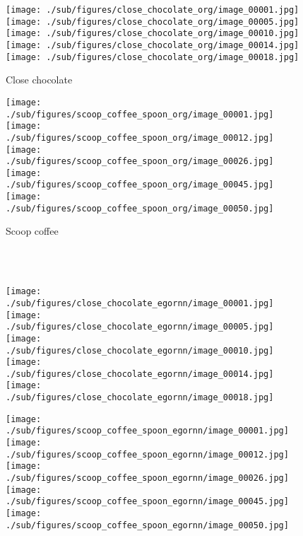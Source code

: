 \documentclass[10pt,twocolumn,letterpaper]{article}
\begin{document}
\begin{matrix*}[r]
\begin{figure*}[t]
		\centering      
        \begin{subfigure}[b]{0.4\textwidth}
			\caption*{Close chocolate}
\vspace{-0.18cm}
			\texttt{[image: ./sub/figures/close\_chocolate\_org/image\_00001.jpg]}
			\texttt{[image: ./sub/figures/close\_chocolate\_org/image\_00005.jpg]}
			\texttt{[image: ./sub/figures/close\_chocolate\_org/image\_00010.jpg]}
			\texttt{[image: ./sub/figures/close\_chocolate\_org/image\_00014.jpg]}
			\texttt{[image: ./sub/figures/close\_chocolate\_org/image\_00018.jpg]}
			\end{subfigure} \hskip 5mm
	        \begin{subfigure}[b]{0.4\textwidth}
			\caption*{Scoop coffee}
\vspace{-0.18cm}
			\texttt{[image: ./sub/figures/scoop\_coffee\_spoon\_org/image\_00001.jpg]}
			\texttt{[image: ./sub/figures/scoop\_coffee\_spoon\_org/image\_00012.jpg]}
			\texttt{[image: ./sub/figures/scoop\_coffee\_spoon\_org/image\_00026.jpg]}
			\texttt{[image: ./sub/figures/scoop\_coffee\_spoon\_org/image\_00045.jpg]}
			\texttt{[image: ./sub/figures/scoop\_coffee\_spoon\_org/image\_00050.jpg]}
		\end{subfigure}\\
	\ 	
        \begin{subfigure}[b]{0.4\textwidth}
			\texttt{[image: ./sub/figures/close\_chocolate\_egornn/image\_00001.jpg]}
			\texttt{[image: ./sub/figures/close\_chocolate\_egornn/image\_00005.jpg]}
			\texttt{[image: ./sub/figures/close\_chocolate\_egornn/image\_00010.jpg]}
			\texttt{[image: ./sub/figures/close\_chocolate\_egornn/image\_00014.jpg]}
			\texttt{[image: ./sub/figures/close\_chocolate\_egornn/image\_00018.jpg]}
			\end{subfigure} \hskip 5mm
	        \begin{subfigure}[b]{0.4\textwidth}
			\texttt{[image: ./sub/figures/scoop\_coffee\_spoon\_egornn/image\_00001.jpg]}
			\texttt{[image: ./sub/figures/scoop\_coffee\_spoon\_egornn/image\_00012.jpg]}
			\texttt{[image: ./sub/figures/scoop\_coffee\_spoon\_egornn/image\_00026.jpg]}
			\texttt{[image: ./sub/figures/scoop\_coffee\_spoon\_egornn/image\_00045.jpg]}
			\texttt{[image: ./sub/figures/scoop\_coffee\_spoon\_egornn/image\_00050.jpg]}

\end{subfigure}
\end{figure*}
\end{matrix*}
\end{document}
